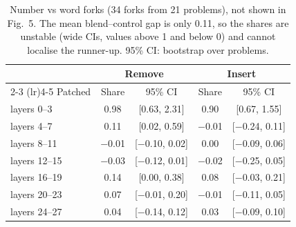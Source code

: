 \begin{table}[t]
\centering
\small
\caption{Number vs word forks (34 forks from 21 problems), not shown in Fig.~5. The mean blend--control gap is only 0.11, so the shares are unstable (wide CIs, values above 1 and below 0) and cannot localise the runner-up. 95\% CI: bootstrap over problems.}
\label{tab:fig5-nw}
\begin{tabular}{lcccc}
\toprule
 & \multicolumn{2}{c}{Remove} & \multicolumn{2}{c}{Insert} \\
\cmidrule(lr){2-3} \cmidrule(lr){4-5}
Patched & Share & 95\% CI & Share & 95\% CI \\
\midrule
layers 0--3 & 0.98 & [0.63, 2.31] & 0.90 & [0.67, 1.55] \\
layers 4--7 & 0.11 & [0.02, 0.59] & $-$0.01 & [$-$0.24, 0.11] \\
layers 8--11 & $-$0.01 & [$-$0.10, 0.02] & 0.00 & [$-$0.09, 0.06] \\
layers 12--15 & $-$0.03 & [$-$0.12, 0.01] & $-$0.02 & [$-$0.25, 0.05] \\
layers 16--19 & 0.14 & [0.00, 0.38] & 0.08 & [$-$0.03, 0.21] \\
layers 20--23 & 0.07 & [$-$0.01, 0.20] & $-$0.01 & [$-$0.11, 0.05] \\
layers 24--27 & 0.04 & [$-$0.14, 0.12] & 0.03 & [$-$0.09, 0.10] \\
\bottomrule
\end{tabular}
\end{table}
